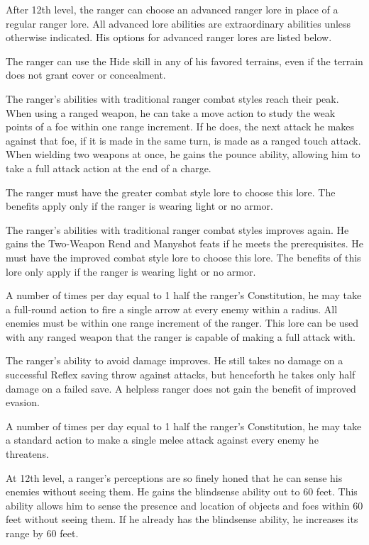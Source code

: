  After 12th level, the ranger can choose an advanced ranger lore in place of a regular ranger lore. All advanced lore abilities are extraordinary abilities unless otherwise indicated. His options for advanced ranger lores are listed below.

 The ranger can use the Hide skill in any of his favored terrains, even if the terrain does not grant cover or concealment.

 The ranger's abilities with traditional ranger combat styles reach their peak. When using a ranged weapon, he can take a move action to study the weak points of a foe within one range increment. If he does, the next attack he makes against that foe, if it is made in the same turn, is made as a ranged touch attack. When wielding two weapons at once, he gains the pounce ability, allowing him to take a full attack action at the end of a charge.

The ranger must have the greater combat style lore to choose this lore. The benefits apply only if the ranger is wearing light or no armor.

 The ranger's abilities with traditional ranger combat styles improves again. He gains the Two-Weapon Rend and Manyshot feats if he meets the prerequisites. He must have the improved combat style lore to choose this lore. The benefits of this lore only apply if the ranger is wearing light or no armor.

 A number of times per day equal to 1 \add half the ranger's Constitution, he may take a full-round action to fire a single arrow at every enemy within a \areamed radius. All enemies must be within one range increment of the ranger. This lore can be used with any ranged weapon that the ranger is capable of making a full attack with.

 The ranger's ability to avoid damage improves. He still takes no damage on a successful Reflex saving throw against attacks, but henceforth he takes only half damage on a failed save. A helpless ranger does not gain the benefit of improved evasion.

 A number of times per day equal to 1 \add half the ranger's Constitution, he may take a standard action to make a single melee attack against every enemy he threatens.

 At 12th level, a ranger's perceptions are so finely honed that he can sense his enemies without seeing them. He gains the blindsense ability out to 60 feet. This ability allows him to sense the presence and location of objects and foes within 60 feet without seeing them. If he already has the blindsense ability, he increases its range by 60 feet.

